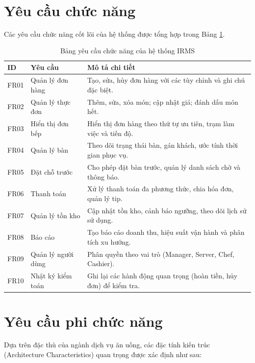 \section{Yêu cầu chức năng}

Các yêu cầu chức năng cốt lõi của hệ thống được tổng hợp trong Bảng \ref{tab:functional_requirements}.

\begin{table}[H]
\centering
\caption{Bảng yêu cầu chức năng của hệ thống IRMS}
\label{tab:functional_requirements}
\begin{tabularx}{\textwidth}{|l|l|X|}
\hline
\textbf{ID} & \textbf{Yêu cầu} & \textbf{Mô tả chi tiết} \\ \hline
FR01 & Quản lý đơn hàng & Tạo, sửa, hủy đơn hàng với các tùy chỉnh và ghi chú đặc biệt. \\ \hline
FR02 & Quản lý thực đơn & Thêm, sửa, xóa món; cập nhật giá; đánh dấu món hết. \\ \hline
FR03 & Hiển thị đơn bếp & Hiển thị đơn hàng theo thứ tự ưu tiên, trạm làm việc và tiến độ. \\ \hline
FR04 & Quản lý bàn & Theo dõi trạng thái bàn, gán khách, ước tính thời gian phục vụ. \\ \hline
FR05 & Đặt chỗ trước & Cho phép đặt bàn trước, quản lý danh sách chờ và thông báo. \\ \hline
FR06 & Thanh toán & Xử lý thanh toán đa phương thức, chia hóa đơn, quản lý tip. \\ \hline
FR07 & Quản lý tồn kho & Cập nhật tồn kho, cảnh báo ngưỡng, theo dõi lịch sử sử dụng. \\ \hline
FR08 & Báo cáo & Tạo báo cáo doanh thu, hiệu suất vận hành và phân tích xu hướng. \\ \hline
FR09 & Quản lý người dùng & Phân quyền theo vai trò (Manager, Server, Chef, Cashier). \\ \hline
FR10 & Nhật ký kiểm toán & Ghi lại các hành động quan trọng (hoàn tiền, hủy đơn) để kiểm tra. \\ \hline
\end{tabularx}
\end{table}

\section{Yêu cầu phi chức năng}

Dựa trên đặc thù của ngành dịch vụ ăn uống, các đặc tính kiến trúc (Architecture Characteristics) quan trọng được xác định như sau:


